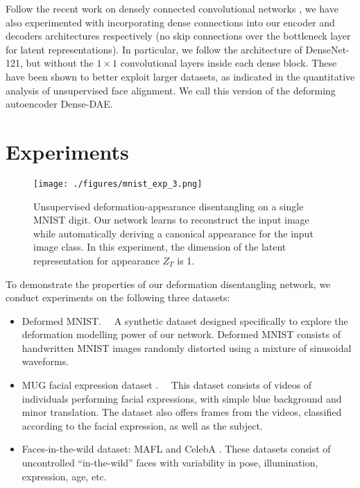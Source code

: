 \documentclass[runningheads]{llncs}
\begin{document}
Follow the recent work on densely connected convolutional networks \cite{huang2017densely}, we have also experimented with incorporating dense connections into our encoder and decoders architectures respectively (no skip connections over the bottleneck layer for latent representations). In particular, we follow the architecture of DenseNet-121, but without the $1 \times 1$ convolutional layers inside each dense block. These have been shown to better exploit larger datasets, as indicated in the quantitative analysis of unsupervised face alignment. We call this version of the deforming autoencoder Dense-DAE.

\section{Experiments}



\begin{figure}
    \centering
    \texttt{[image: ./figures/mnist\_exp\_3.png]}
    \caption{Unsupervised deformation-appearance disentangling on a single MNIST digit. Our network learns to reconstruct the input image while automatically deriving a canonical appearance for the input image class. In this experiment, the dimension of the latent representation for appearance $Z_T$ is 1.}
    \label{fig:mnist_1}
\end{figure}

To demonstrate the properties of our deformation disentangling network, we conduct experiments on the following three datasets:
\begin{itemize}
\item Deformed MNIST.  ~~A synthetic dataset designed specifically to explore the deformation modelling power of our network. Deformed MNIST consists of 
      handwritten MNIST images randomly distorted using a mixture of sinusoidal waveforms. 
\item MUG facial expression dataset \cite{mugfacialexpr}. ~~This dataset consists of videos of individuals performing facial expressions, with simple blue background and minor translation. The dataset also offers frames from the videos, classified according to the facial expression, as well as the subject.
\item Faces-in-the-wild dataset: MAFL \cite{xiaooutangmafldataset} and CelebA \cite{liu2015faceattributes}. These datasets consist of uncontrolled ``in-the-wild'' faces with variability in  pose, illumination, expression, age, etc.
\end{itemize}
\end{document}
